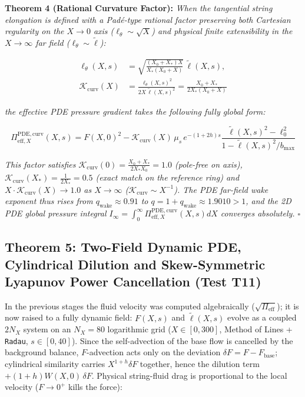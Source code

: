 \documentclass[12pt,a4paper]{article}
\begin{document}
\textbf{Theorem 4 (Rational Curvature Factor):} \textit{When the tangential string elongation is defined with a Padé-type rational factor preserving both Cartesian regularity on the $X \to 0$ axis ($\ell_\theta \sim \sqrt{X}$) and physical finite extensibility in the $X \to \infty$ far field ($\ell_\theta \sim \tilde{\ell}$):}

\begin{equation}
\begin{split}
\ell_\theta(X, s) &= \sqrt{\frac{(X_0 + X_*) X}{X_* (X_0 + X)}} \, \tilde{\ell}(X, s), \\
\mathcal{K}_{\mathrm{curv}}(X) &= \frac{\ell_\theta(X, s)^2}{2 X \, \tilde{\ell}(X, s)^2} = \frac{X_0 + X_*}{2 X_* (X_0 + X)}
\label{eq:Kcurv}
\end{split}
\end{equation}

\textit{the effective PDE pressure gradient takes the following fully global form:}

\begin{equation}
\Pi_{\mathrm{eff}, X}^{\mathrm{PDE, curv}}(X, s) = F(X, 0)^2 - \mathcal{K}_{\mathrm{curv}}(X) \, \mu_s \, e^{-(1+2h)s} \frac{\tilde{\ell}(X, s)^2 - \ell_0^2}{1 - \tilde{\ell}(X, s)^2 / b_{\max}}
\end{equation}

\textit{This factor satisfies $\mathcal{K}_{\mathrm{curv}}(0) = \frac{X_0+X_*}{2X_*X_0} = 1.0$ (pole-free on axis), $\mathcal{K}_{\mathrm{curv}}(X_*) = \frac{1}{2X_*} = 0.5$ (exact match on the reference ring) and $X \cdot \mathcal{K}_{\mathrm{curv}}(X) \to 1.0$ as $X \to \infty$ ($\mathcal{K}_{\mathrm{curv}} \sim X^{-1}$). The PDE far-field wake exponent thus rises from $q_{\mathrm{wake}} \approx 0.91$ to $q = 1 + q_{\mathrm{wake}} \approx 1.9010 > 1$, and the 2D PDE global pressure integral $I_\infty = \int_0^\infty \Pi_{\mathrm{eff}, X}^{\mathrm{PDE, curv}}(X, s) dX$ converges absolutely. $\square$}

\subsection{Theorem 5: Two-Field Dynamic PDE, Cylindrical Dilution and Skew-Symmetric Lyapunov Power Cancellation (Test T11)}

In the previous stages the fluid velocity was computed algebraically ($\sqrt{\Pi_{\mathrm{eff}}}$); it is now raised to a fully dynamic field: $F(X, s)$ and $\tilde{\ell}(X, s)$ evolve as a coupled $2 N_X$ system on an $N_X = 80$ logarithmic grid ($X \in [0, 300]$, Method of Lines + \texttt{Radau}, $s \in [0, 40]$). Since the self-advection of the base flow is cancelled by the background balance, $F$-advection acts only on the deviation $\delta F = F - F_{\mathrm{base}}$; cylindrical similarity carries $X^{1+h} \delta F$ together, hence the dilution term $+(1+h) W(X,0) \, \delta F$. Physical string-fluid drag is proportional to the local velocity ($F \to 0^+$ kills the force):
\end{document}
